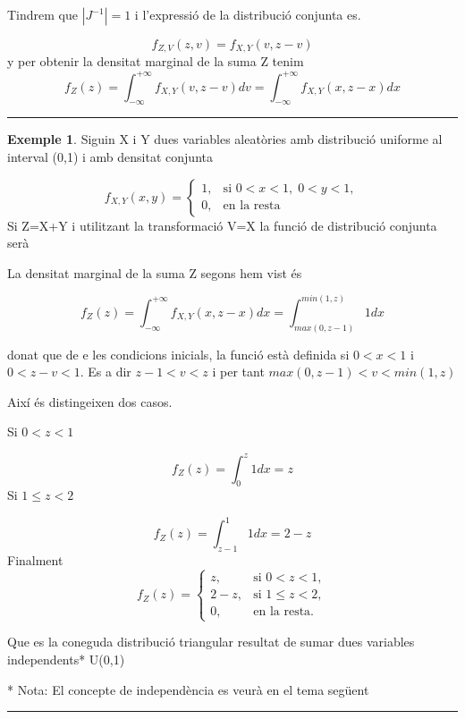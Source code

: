 \documentclass[
  catalan,
]{article}
\theoremstyle{definition}
\theoremstyle{definition}
\newtheorem{example}{Exemple}[section]
\theoremstyle{definition}
\theoremstyle{definition}
\theoremstyle{remark}
\begin{document}
Tindrem que \(|J^{-1}|=1\) i l'expressió de la distribució conjunta es.

\[
f_{Z,V}(z,v)=f_{X,Y}(v,z-v)
\]
y per obtenir la densitat marginal de la suma Z tenim
\[
 f_Z(z)=\int_{- \infty}^{+ \infty} f_{X,Y}(v,z-v)dv =\int_{- \infty}^{+ \infty} f_{X,Y}(x,z-x)dx 
\]

\begin{center}\rule{0.5\linewidth}{0.5pt}\end{center}

\begin{example}
\protect\hypertarget{exm:suma}{}\label{exm:suma}Siguin X i Y dues variables aleatòries amb distribució uniforme al interval (0,1) i amb densitat conjunta

\[
f_{X,Y}(x,y)=
\begin{cases}
1, & \text{si } 0<x<1,\;0<y<1,\\
0, & \text{en la resta}
\end{cases}
\]
Si Z=X+Y i utilitzant la transformació V=X la funció de distribució conjunta serà

La densitat marginal de la suma Z segons hem vist és

\[
f_Z(z)=\int_{- \infty}^{+ \infty} f_{X,Y}(x,z-x)dx =\int_{max(0,z-1)}^{min(1,z)} 1 dx 
\]

donat que de e les condicions inicials, la funció està definida si \(0<x<1\) i \(0<z-v<1\). Es a dir \(z-1<v<z\) i per tant \(max(0,z-1) <v<min(1,z)\)

Així és distingeixen dos casos.

Si \(0<z<1\)

\[
f_Z(z)= \int_{0}^{z} 1 dx= z 
\]
Si \(1\leq z<2\)

\[
f_Z(z)= \int_{z-1}^{1} 1 dx= 2-z 
\]
Finalment
\[
f_Z(z)=
\begin{cases}
z, & \text{si } 0<z<1,\\
2-z, & \text{si } 1\le z<2,\\
0, & \text{en la resta.}
\end{cases}
\]

Que es la coneguda distribució triangular resultat de sumar dues variables independents* U(0,1)

* Nota: El concepte de independència es veurà en el tema següent

\end{example}

\begin{center}\rule{0.5\linewidth}{0.5pt}\end{center}
\end{document}
